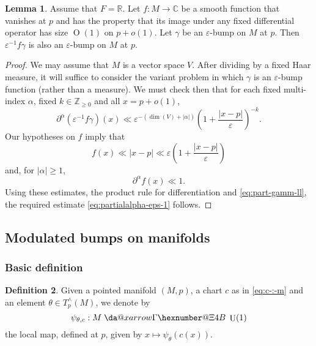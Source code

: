 \documentclass[reqno]{amsart}
\makeatletter
\newcommand*{\da@rightarrow}{\mathchar"0\hexnumber@\symAMSa 4B }
\newcommand*{\xdashrightarrow}[2][]{%
  \mathrel{%
    \mathpalette{\da@xarrow{#1}{#2}{}\da@rightarrow{\,}{}}{}%
  }%
}
\newcommand*{\da@xarrow}[7]{%
  \sbox0{$\ifx#7\scriptstyle\scriptscriptstyle\else\scriptstyle\fi#5#1#6\m@th$}%
  \sbox2{$\ifx#7\scriptstyle\scriptscriptstyle\else\scriptstyle\fi#5#2#6\m@th$}%
  \sbox4{$#7\dabar@\m@th$}%
  \dimen@=\wd0 %
  \ifdim\wd2 >\dimen@
    \dimen@=\wd2 %
  \fi
  \count@=2 %
  \def\da@bars{\dabar@\dabar@}%
  \@whiledim\count@\wd4<\dimen@\do{%
    \advance\count@\@ne
    \expandafter\def\expandafter\da@bars\expandafter{%
      \da@bars
      \dabar@ 
    }%
  }%
  \mathrel{#3}%
  \mathrel{%
    \mathop{\da@bars}\limits
    \ifx\\#1\\%
    \else
      _{\copy0}%
    \fi
    \ifx\\#2\\%
    \else
      ^{\copy2}%
    \fi
  }%
  \mathrel{#4}%
}
\def\eps{\varepsilon}
\DeclareMathOperator{\U}{U}
\def\O{\operatorname{O}}
\theoremstyle{plain} \newtheorem{theorem} {Theorem}
\theoremstyle{definition} \newtheorem{definition} [theorem] {Definition}
\theoremstyle{itplain} %
\newtheorem{lemma}[theorem]{Lemma}
\numberwithin{equation}{section}
\numberwithin{theorem}{section}
\renewcommand{\geq}{\geqslant}
\makeatother
\begin{document}
\begin{lemma}\label{lem:standard2:let-f-vanish-at-p-eps-bump}
  Assume that $F = \mathbb{R}$.  Let $f : M \rightarrow \mathbb{C}$ be a smooth function that vanishes at $p$ and has the property that its image under any fixed differential operator has size $\O(1)$ on $p + o(1)$.  Let $\gamma$ be an $\eps$-bump on $M$ at $p$.  Then $\eps^{-1} f \gamma$ is also an $\eps$-bump on $M$ at $p$.
\end{lemma}
\begin{proof}
  We may assume that $M$ is a vector space $V$.  After dividing by a fixed Haar measure, it will suffice to consider the variant problem in which $\gamma$ is an $\eps$-bump function (rather than a measure).  We must check then that for each fixed multi-index $\alpha$, fixed $k \in \mathbb{Z}_{\geq 0}$ and all $x = p + o(1)$,
  \begin{equation}\label{eq:partialalpha-eps-1}
    \partial^\alpha (\eps^{-1} f  \gamma)(x) \ll \eps^{ -(\dim (V) + |\alpha|)}  \left( 1 + \frac{|x-p|}{\eps} \right)^{-k}.
  \end{equation}
  Our hypotheses on $f$ imply that
  \begin{equation*}
    f(x) \ll |x - p| \ll \eps \left( 1 + \frac{|x-p|}{\eps } \right)
  \end{equation*}
  and, for $|\alpha| \geq 1$,
  \begin{equation*}
    \partial^\alpha f(x) \ll 1.
  \end{equation*}
  Using these estimates, the product rule for differentiation and \eqref{eq:part-gamm-ll}, the required estimate \eqref{eq:partialalpha-eps-1} follows.
\end{proof}

\subsection{Modulated bumps on manifolds}\label{sec:class-bumps}

\subsubsection{Basic definition}

\begin{definition}\label{defn:standard2:given-point-manif}
Given a pointed manifold $(M,p)$, a chart $c$ as in \eqref{eq:c-:-m} and an element $\theta \in T_p^\wedge(M)$, we denote by
\begin{equation*}
  \psi_{\theta,c} : M \xdashrightarrow{} \U(1)
\end{equation*}
the local map, defined at $p$, given by $x \mapsto \psi_\theta(c(x))$.
\end{definition}
\end{document}
